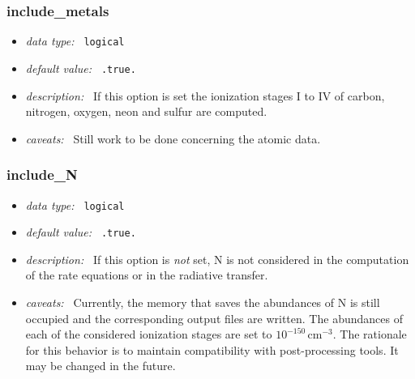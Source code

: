 \documentclass[a4paper,10pt]{article}
\begin{document}
\subsubsection{include\_metals}
\label{opt:includemetals}
\begin{itemize}
 \item \textit{data type:~} \texttt{logical}
 \item \textit{default value:~} \texttt{.true.}
 \item \textit{description:~} If this option is set the ionization stages 
  I to IV of carbon, nitrogen, oxygen, neon and sulfur are computed.
 \item \textit{caveats:~} Still work to be done concerning the atomic data.
\end{itemize}


\subsubsection{include\_N}
\label{opt:includen}
\begin{itemize}
 \item \textit{data type:~} \texttt{logical}
 \item \textit{default value:~} \texttt{.true.}
 \item \textit{description:~} If this option is 
 \textit{not} set, N is not considered 
 in the computation of the rate equations or in the
 radiative transfer. 
 \item \textit{caveats:~} Currently, the memory that saves the 
 abundances of N is still occupied and the corresponding output
 files are written. The abundances of each of the considered ionization
 stages are set to $10^{-150}\,\mathrm{cm^{-3}}$. The rationale for
 this behavior is to maintain compatibility with post-processing
 tools. It may be changed in the future.
\end{itemize}
\end{document}
